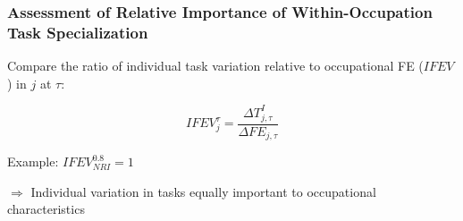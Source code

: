 \documentclass[10pt]{beamer}
\begin{document}








\begin{frame} 
	\frametitle{Assessment of Relative Importance of Within-Occupation Task Specialization}
	
	
	
	
	
	Compare the ratio of individual task variation relative to occupational FE ($IFEV$) in $j$ at $\tau$: 
	
	\begin{equation} \label{ifev}
	IFEV_{j}^{\tau} = \frac{\Delta T_{j, \tau}^{I}}{\Delta FE_{j, \tau}}  
	\end{equation}
	
	\bigskip
	
	Example: $IFEV_{NRI}^{0.8} = 1$
	
	\medskip
	
	$\Longrightarrow$ Individual variation in tasks equally important to occupational characteristics  
	
	
\end{frame}
\end{document}

